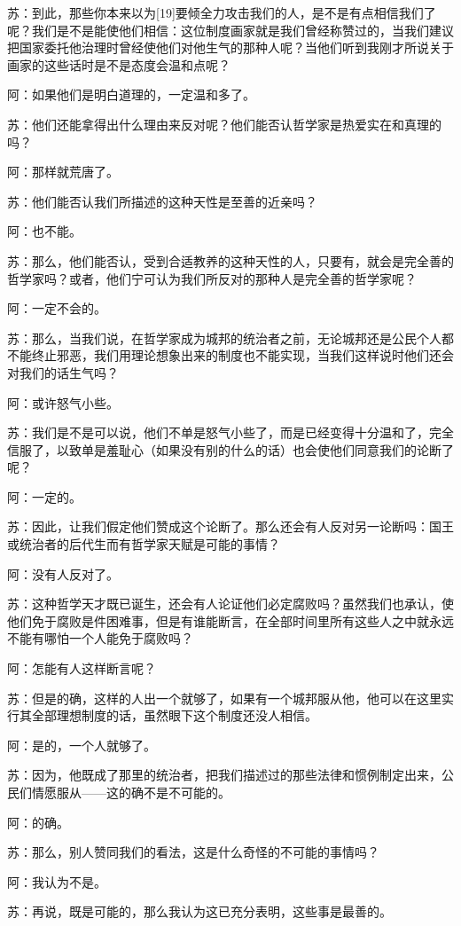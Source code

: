 \documentclass[12pt,oneside]{book}
\begin{document}
苏：到此，那些你本来以为[19]要倾全力攻击我们的人，是不是有点相信我们了呢？我们是不是能使他们相信：这位制度画家就是我们曾经称赞过的，当我们建议把国家委托他治理时曾经使他们对他生气的那种人呢？当他们听到我刚才所说关于画家的这些话时是不是态度会温和点呢？

阿：如果他们是明白道理的，一定温和多了。

苏：他们还能拿得出什么理由来反对呢？他们能否认哲学家是热爱实在和真理的吗？

阿：那样就荒唐了。

苏：他们能否认我们所描述的这种天性是至善的近亲吗？

阿：也不能。

苏：那么，他们能否认，受到合适教养的这种天性的人，只要有，就会是完全善的哲学家吗？或者，他们宁可认为我们所反对的那种人是完全善的哲学家呢？

阿：一定不会的。

苏：那么，当我们说，在哲学家成为城邦的统治者之前，无论城邦还是公民个人都不能终止邪恶，我们用理论想象出来的制度也不能实现，当我们这样说时他们还会对我们的话生气吗？

阿：或许怒气小些。

苏：我们是不是可以说，他们不单是怒气小些了，而是已经变得十分温和了，完全信服了，以致单是羞耻心（如果没有别的什么的话）也会使他们同意我们的论断了呢？

阿：一定的。

苏：因此，让我们假定他们赞成这个论断了。那么还会有人反对另一论断吗：国王或统治者的后代生而有哲学家天赋是可能的事情？

阿：没有人反对了。

苏：这种哲学天才既已诞生，还会有人论证他们必定腐败吗？虽然我们也承认，使他们免于腐败是件困难事，但是有谁能断言，在全部时间里所有这些人之中就永远不能有哪怕一个人能免于腐败吗？

阿：怎能有人这样断言呢？

苏：但是的确，这样的人出一个就够了，如果有一个城邦服从他，他可以在这里实行其全部理想制度的话，虽然眼下这个制度还没人相信。

阿：是的，一个人就够了。

苏：因为，他既成了那里的统治者，把我们描述过的那些法律和惯例制定出来，公民们情愿服从——这的确不是不可能的。

阿：的确。

苏：那么，别人赞同我们的看法，这是什么奇怪的不可能的事情吗？

阿：我认为不是。

苏：再说，既是可能的，那么我认为这已充分表明，这些事是最善的。
\end{document}
